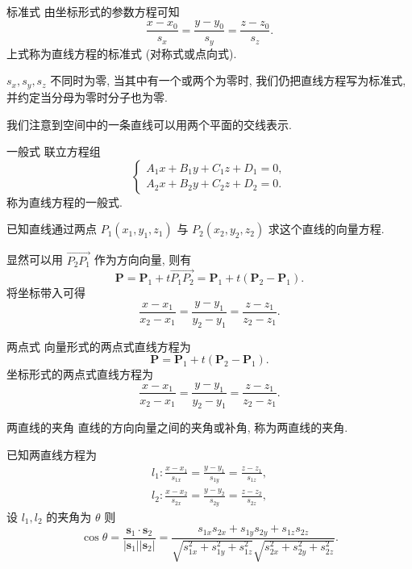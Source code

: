 \documentclass[cn,toc=twocol]{elegantbook}
\newcommand{\ve}[1]{\boldsymbol{#1}}
\newcommand{\Ve}[1]{\overrightarrow{#1}}
\begin{document}
\begin{proposition}{标准式}
	由坐标形式的参数方程可知
	\[
		\frac{x - x_0}{s_x} = \frac{y - y_0}{s_y} = \frac{z - z_0}{s_z}.
	\]
	上式称为直线方程的标准式 (对称式或点向式).
\end{proposition}
\begin{remark}
	$s_x, s_y, s_z$ 不同时为零, 当其中有一个或两个为零时, 我们仍把直线方程写为标准式, 并约定当分母为零时分子也为零.
\end{remark}

我们注意到空间中的一条直线可以用两个平面的交线表示.
\begin{proposition}{一般式}
联立方程组
\[
	\begin{cases}
		A_1 x + B_1 y + C_1 z + D_1 = 0,\\
		A_2 x + B_2 y + C_2 z + D_2 = 0.
	\end{cases}
\]
称为直线方程的一般式.
\end{proposition}

\begin{example}
	已知直线通过两点 $P_1 (x_1, y_1, z_1)$ 与 $P_2 (x_2, y_2, z_2)$ 求这个直线的向量方程.
\end{example}

\begin{solution}
显然可以用 $\Ve{P_2 P_1}$ 作为方向向量, 则有
\[
	\ve P = \ve P_1 + t \Ve{P_1 P_2} = \ve P_1 + t (\ve P_2 - \ve P_1).
\]	
将坐标带入可得
\[
	\frac{x - x_1}{x_2 - x_1} = \frac{y - y_1}{y_2 - y_1} = \frac{z - z_1}{z_2 - z_1}.
\]
\end{solution}

\begin{proposition}{两点式}
	向量形式的两点式直线方程为
	\[
		\ve P = \ve P_1 + t (\ve P_2 - \ve P_1).
	\]	
	坐标形式的两点式直线方程为
	\[
		\frac{x - x_1}{x_2 - x_1} = \frac{y - y_1}{y_2 - y_1} = \frac{z - z_1}{z_2 - z_1}.
	\]
	
\end{proposition}

\begin{definition}{两直线的夹角}
	直线的方向向量之间的夹角或补角, 称为两直线的夹角.
	
	已知两直线方程为
	\[
	\begin{aligned}
		l_1 : \frac{x - x_1}{s_{1x}} = \frac{y - y_1}{s_{1y}} = \frac{z - z_1}{s_{1z}},\\
		l_2 : \frac{x - x_2}{s_{2x}} = \frac{y - y_2}{s_{2y}} = \frac{z - z_2}{s_{2z}},
	\end{aligned}
	\]
	设 $l_1, l_2$ 的夹角为 $\theta$ 则
	\[
		\cos \theta = \frac{\ve s_1 \cdot \ve s_2}{\lvert \ve s_1 \rvert \lvert \ve s_2 \rvert} = \frac{s_{1x}s_{2x} + s_{1y}s_{2y} + s_{1z}s_{2z}}{\sqrt{s_{1x}^2 + s_{1y}^2 + s_{1z}^2}\sqrt{s_{2x}^2 + s_{2y}^2 + s_{2z}^2}}.
	\]
\end{definition}
\end{document}

